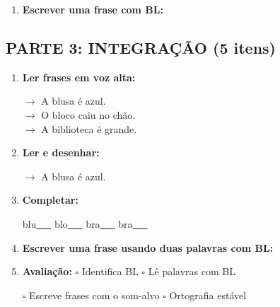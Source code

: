 \begin{exercicio}
\begin{enumerate}[resume]
  \item \textbf{Escrever uma frase com BL:}
  \begin{center}
  \underline{\hspace{12cm}}
  \end{center}

\end{enumerate}

\subsection*{PARTE 3: INTEGRAÇÃO (5 itens)}

\begin{enumerate}[resume]

  \item \textbf{Ler frases em voz alta:}
  \begin{center}
  $\rightarrow$ A blusa é azul.\\
  $\rightarrow$ O bloco caiu no chão.\\
  $\rightarrow$ A biblioteca é grande.\\
  \end{center}

  \item \textbf{Ler e desenhar:}
  \begin{center}
  $\rightarrow$ A blusa é azul.
  \end{center}
  \begin{center}
  \end{center}

  \item \textbf{Completar:}
  \begin{center}
  blu\underline{~~~} \quad blo\underline{~~~} \quad bra\underline{~~~} \quad bra\underline{~~~}
  \end{center}

  \item \textbf{Escrever uma frase usando duas palavras com BL:}
  \begin{center}
  \underline{\hspace{12cm}}
  \end{center}

  \item \textbf{Avaliação:} $\square$ Identifica BL \quad $\square$ Lê palavras com BL
  \begin{center}
  $\square$ Escreve frases com o som-alvo \quad $\square$ Ortografia estável
  \end{center}


\end{enumerate}
\end{exercicio}

